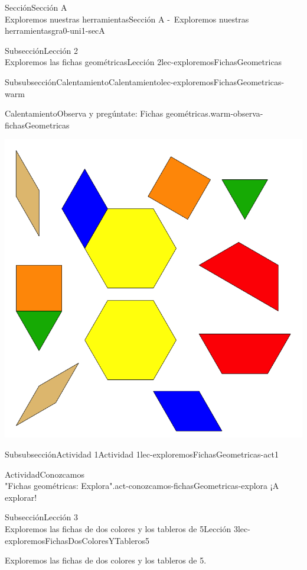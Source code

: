 \begin{sectionptx}{Sección}{{\Large Sección A\\}Exploremos nuestras herramientas}{}{Sección A -~Exploremos nuestras herramientas}{}{}{gra0-uni1-secA}
\begin{subsectionptx}{Subsección}{{\normalsize Lección 2\\[-0.05cm]}Exploremos las fichas geométricas}{}{Lección 2}{}{}{lec-exploremosFichasGeometricas}
\begin{subsubsectionptx}{Subsubsección}{Calentamiento}{}{Calentamiento}{}{}{lec-exploremosFichasGeometricas-warm}
\begin{exploration}{Calentamiento}{Observa y pregúntate: Fichas geométricas.}{warm-observa-fichasGeometricas}
\begin{image}{0}{1}{0}{}
\includegraphics[max width=0.65\linewidth, center]{external/svg-source/tikz-file-148141.pdf}
\end{image}%
\end{exploration}%
\end{subsubsectionptx}
%
%
\typeout{************************************************}
\typeout{************************************************}
%
\begin{subsubsectionptx}{Subsubsección}{Actividad 1}{}{Actividad 1}{}{}{lec-exploremosFichasGeometricas-act1}
\begin{activity}{Actividad}{Conozcamos\\"Fichas geométricas: Explora".}{act-conozcamos-fichasGeometricas-explora}%
¡A explorar!%
\end{activity}%
\end{subsubsectionptx}
\end{subsectionptx}
%
%
\typeout{************************************************}
\typeout{************************************************}
%
\begin{subsectionptx}{Subsección}{{\normalsize Lección 3\\[-0.05cm]}Exploremos las fichas de dos colores y los tableros de 5}{}{Lección 3}{}{}{lec-exploremosFichasDosColoresYTableros5}
\begin{introduction}{}%
Exploremos las fichas de dos colores y los tableros de 5.%
\end{introduction}%
%
%
\typeout{************************************************}
\typeout{************************************************}

\end{subsectionptx}
\end{sectionptx}
